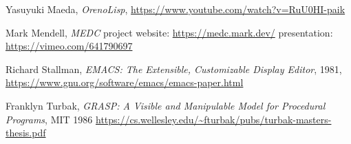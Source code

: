 \documentclass[sigconf]{acmart}
\begin{document}
\begin{thebibliography}{14}
  Yasuyuki Maeda, \emph{OrenoLisp}, \url{https://www.youtube.com/watch?v=RuU0HI-paik}

  Mark Mendell, \emph{MEDC}
  project website: \url{https://medc.mark.dev/}
  presentation: \url{https://vimeo.com/641790697}
  
  Richard Stallman, \emph{EMACS: The Extensible, Customizable Display Editor},
  1981, \url{https://www.gnu.org/software/emacs/emacs-paper.html}

  Franklyn Turbak, \emph{GRASP: A Visible and Manipulable Model for Procedural Programs}, MIT 1986 \url{https://cs.wellesley.edu/~fturbak/pubs/turbak-masters-thesis.pdf}
  
\end{thebibliography}
\end{document}
